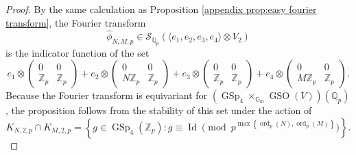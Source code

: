 \documentclass[12pt]{amsart}
\DeclareMathOperator{\ord}{ord}
\theoremstyle{definition}
\newcommand{\Z}{\mathbb{Z}}
\newcommand{\Q}{\mathbb{Q}}
\newcommand{\set}[1]{\left\{#1\right\}}
\DeclareMathOperator{\GSp}{GSp}
\begin{document}
\begin{proof}
    By the same calculation as Proposition \ref{appendix prop:easy fourier transform}, the Fourier transform $$\widehat\phi_{N,M,p} \in \mathcal S_{\Q_p} (\langle e_1,e_2,e_3,e_4\rangle \otimes V_2)$$
    is the indicator function of the set
    $$e_1 \otimes \begin{pmatrix}
        0 & 0 \\ \Z_p & \Z_p 
    \end{pmatrix} + e_2 \otimes \begin{pmatrix}
        0 & 0 \\ N\Z_p & \Z_p 
    \end{pmatrix} + e_3 \otimes \begin{pmatrix}
        0 & 0 \\ \Z_p & \Z_p 
    \end{pmatrix} + e_4 \otimes \begin{pmatrix}
        0 & 0 \\ M\Z_p & \Z_p 
    \end{pmatrix}.$$
    Because the Fourier transform is equivariant for $(\GSp_4\times_{\mathbb G_m}\operatorname{GSO}(V))(\Q_p)$, the proposition follows from the stability of this  set under the action of $$K_{N,2,p}\cap K_{M, 2,p} = \set{ g\in \GSp_4(\Z_p): g \equiv \operatorname{Id} \pmod{ p^{\operatorname{max}\set{\ord_p(N),\ord_p(M)}}}}.$$
\end{proof}
\end{document}
